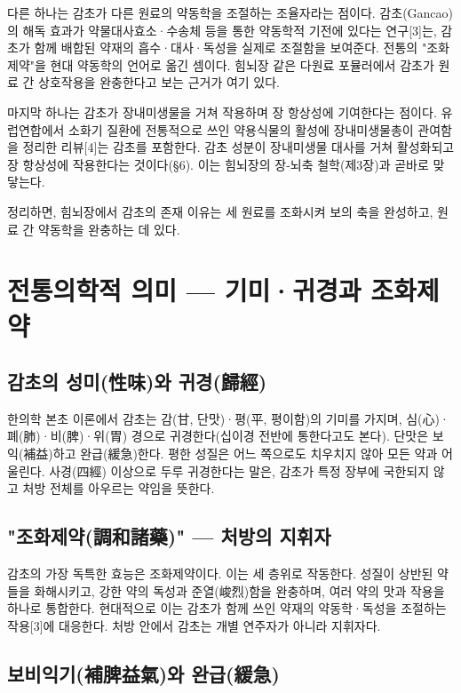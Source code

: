 \documentclass[12pt,oneside]{book}
\begin{document}
다른 하나는 감초가 다른 원료의 약동학을 조절하는 조율자라는 점이다. 감초(Gancao)의 해독 효과가 약물대사효소·수송체 등을 통한 약동학적 기전에 있다는 연구[3]는, 감초가 함께 배합된 약재의 흡수·대사·독성을 실제로 조절함을 보여준다. 전통의 "조화제약"을 현대 약동학의 언어로 옮긴 셈이다. 힘뇌장 같은 다원료 포뮬러에서 감초가 원료 간 상호작용을 완충한다고 보는 근거가 여기 있다.

마지막 하나는 감초가 장내미생물을 거쳐 작용하며 장 항상성에 기여한다는 점이다. 유럽연합에서 소화기 질환에 전통적으로 쓰인 약용식물의 활성에 장내미생물총이 관여함을 정리한 리뷰[4]는 감초를 포함한다. 감초 성분이 장내미생물 대사를 거쳐 활성화되고 장 항상성에 작용한다는 것이다(§6). 이는 힘뇌장의 장-뇌축 철학(제3장)과 곧바로 맞닿는다.

정리하면, 힘뇌장에서 감초의 존재 이유는 세 원료를 조화시켜 보의 축을 완성하고, 원료 간 약동학을 완충하는 데 있다.

\section{전통의학적 의미 — 기미·귀경과 조화제약}

\subsection{감초의 성미(性味)와 귀경(歸經)}

한의학 본초 이론에서 감초는 감(甘, 단맛)·평(平, 평이함)의 기미를 가지며, 심(心)·폐(肺)·비(脾)·위(胃) 경으로 귀경한다(십이경 전반에 통한다고도 본다). 단맛은 보익(補益)하고 완급(緩急)한다. 평한 성질은 어느 쪽으로도 치우치지 않아 모든 약과 어울린다. 사경(四經) 이상으로 두루 귀경한다는 말은, 감초가 특정 장부에 국한되지 않고 처방 전체를 아우르는 약임을 뜻한다.

\subsection{"조화제약(調和諸藥)" — 처방의 지휘자}

감초의 가장 독특한 효능은 조화제약이다. 이는 세 층위로 작동한다. 성질이 상반된 약들을 화해시키고, 강한 약의 독성과 준열(峻烈)함을 완충하며, 여러 약의 맛과 작용을 하나로 통합한다. 현대적으로 이는 감초가 함께 쓰인 약재의 약동학·독성을 조절하는 작용[3]에 대응한다. 처방 안에서 감초는 개별 연주자가 아니라 지휘자다.

\subsection{보비익기(補脾益氣)와 완급(緩急)}
\end{document}
